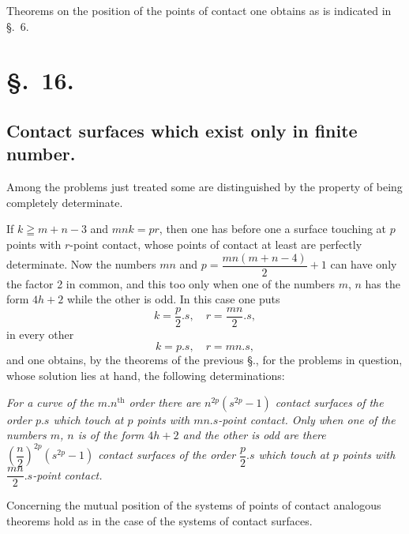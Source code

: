 \documentclass{article}
\begin{document}
Theorems on the position of the points of contact one obtains as is indicated in §.~6.

\section*{§.~16.}

\subsection*{Contact surfaces which exist only in finite number.}

Among the problems just treated some are distinguished by the property of being completely determinate.

If $k\geqq m+n-3$ and $mnk = pr$, then one has before one a surface touching at $p$ points with $r$-point contact, whose points of contact at least are perfectly determinate. Now the numbers $mn$ and $p = \dfrac{mn(m+n-4)}{2}+1$ can have only the factor 2 in common, and this too only when one of the numbers $m$, $n$ has the form $4h+2$ while the other is odd. In this case one puts
\[
k = \frac{p}{2}.s, \quad r = \frac{mn}{2}.s,
\]
in every other
\[
k = p.s, \quad r = mn.s,
\]
and one obtains, by the theorems of the previous §., for the problems in question, whose solution lies at hand, the following determinations:

\emph{For a curve of the $m.n^{\text{th}}$ order there are $n^{2p}(s^{2p}-1)$ contact surfaces of the order $p.s$ which touch at $p$ points with $mn.s$-point contact. Only when one of the numbers $m$, $n$ is of the form $4h+2$ and the other is odd are there $\left(\dfrac{n}{2}\right)^{2p}(s^{2p}-1)$ contact surfaces of the order $\dfrac{p}{2}.s$ which touch at $p$ points with $\dfrac{mn}{2}.s$-point contact.}


Concerning the mutual position of the systems of points of contact analogous theorems hold as in the case of the systems of contact surfaces.
\end{document}
